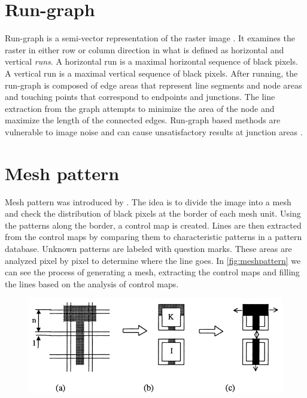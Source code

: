 \section{Run-graph}
Run-graph is a semi-vector representation of the raster image \cite{Monagan1993}. It examines the raster in either row or column direction in what is defined as horizontal and vertical \emph{runs}. A horizontal run is a maximal horizontal sequence of black pixels. A vertical run is a maximal vertical sequence of black pixels. After running, the run-graph is composed of edge areas that represent line segments and node areas and touching points that correspond to endpoints and junctions. The line extraction from the graph attempts to minimize the area of the node and maximize the length of the connected edges. Run-graph based methods are vulnerable to image noise and can cause unsatisfactory results at junction areas \cite{Karabork2008}.

\section{Mesh pattern}
Mesh pattern was introduced by \citet{Lin1985}. The idea is to divide the image into a mesh and check the distribution of black pixels at the border of each mesh unit. Using the patterns along the border, a control map is created. Lines are then extracted from the control maps by comparing them to characteristic patterns in a pattern database. Unknown patterns are labeled with question marks. These areas are analyzed pixel by pixel to determine where the line goes. In \autoref{fig:meshpattern} we can see the process of generating a mesh, extracting the control maps and filling the lines based on the analysis of control maps. 

\begin{figure}[H]
	\centering
	\includegraphics[width=0.8\linewidth]{fig/meshpattern.png}
	\label{fig:meshpattern}
\end{figure}

